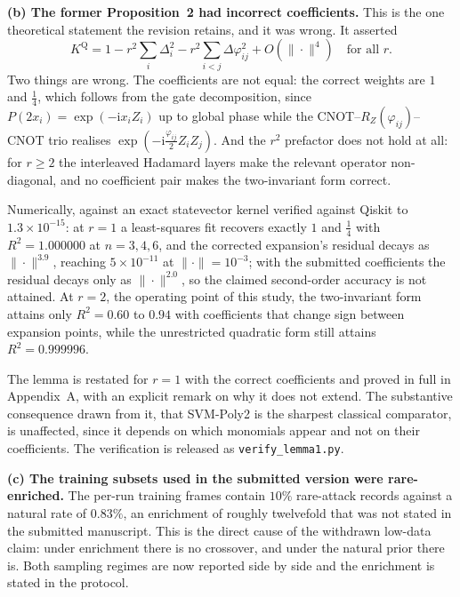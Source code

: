 \documentclass[11pt,a4paper]{article}
\begin{document}
\textbf{(b) The former Proposition~2 had incorrect coefficients.} This is the
one theoretical statement the revision retains, and it was wrong. It asserted
\[
  K^{\mathrm{Q}} = 1 - r^{2}\!\sum_i\Delta_i^2
  - r^{2}\!\!\sum_{i<j}\!\Delta\varphi_{ij}^2 + O(\|\cdot\|^4)
  \quad\text{for all } r .
\]
Two things are wrong. The coefficients are not equal: the correct weights are
$1$ and $\tfrac14$, which follows from the gate decomposition, since
$P(2x_i)=\exp(-\mathrm{i}x_iZ_i)$ up to global phase while the
CNOT--$R_Z(\varphi_{ij})$--CNOT trio realises
$\exp(-\mathrm{i}\tfrac{\varphi_{ij}}{2}Z_iZ_j)$. And the $r^{2}$ prefactor does
not hold at all: for $r\ge2$ the interleaved Hadamard layers make the relevant
operator non-diagonal, and no coefficient pair makes the two-invariant form
correct.

Numerically, against an exact statevector kernel verified against Qiskit to
$1.3\times10^{-15}$: at $r=1$ a least-squares fit recovers exactly $1$ and
$\tfrac14$ with $R^2=1.000000$ at $n=3,4,6$, and the corrected expansion's
residual decays as $\|\cdot\|^{3.9}$, reaching $5\times10^{-11}$ at
$\|\cdot\|=10^{-3}$; with the submitted coefficients the residual decays only as
$\|\cdot\|^{2.0}$, so the claimed second-order accuracy is not attained. At
$r=2$, the operating point of this study, the two-invariant form attains
only $R^2=0.60$ to $0.94$ with coefficients that change sign between expansion
points, while the unrestricted quadratic form still attains $R^2=0.999996$.

The lemma is restated for $r=1$ with the correct coefficients and proved in full
in Appendix~A, with an explicit remark on why it does not extend. The
substantive consequence drawn from it, that SVM-Poly2 is the sharpest
classical comparator, is unaffected, since it depends on which monomials
appear and not on their coefficients. The verification is released as
\texttt{verify\_lemma1.py}.

\textbf{(c) The training subsets used in the submitted version were
rare-enriched.} The per-run training frames contain $10\%$ rare-attack records
against a natural rate of $0.83\%$, an enrichment of roughly twelvefold that
was not stated in the submitted manuscript. This is the direct cause of the
withdrawn low-data claim: under enrichment there is no crossover, and under the
natural prior there is. Both sampling regimes are now reported side by side and
the enrichment is stated in the protocol.

\end{document}
